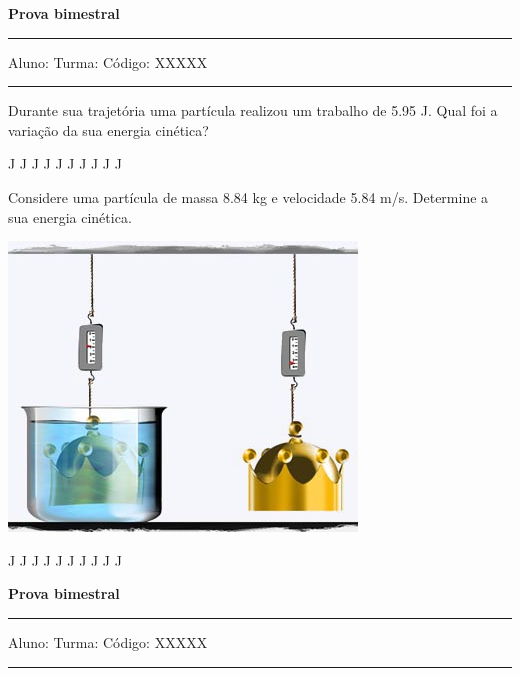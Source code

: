 \documentclass[addpoints]{exam}
\begin{document}
        
\begin{center}
	{\bf \Huge Prova bimestral}
	\vspace{1cm} \hrule \vspace{0.5cm}
	Aluno: \hfill Turma: \hfill Código: XXXXX
	\vspace{0.5cm} \hrule \vspace{0.5cm}
\end{center}

        \begin{questions}
\begin{multicols*}{2}
\question[33] Durante sua trajetória uma partícula realizou um trabalho de    5.95 J. Qual foi a variação da sua energia cinética?

\begin{oneparchoices}
 J J J J J J J J J J\end{oneparchoices}
\question[23] Considere uma partícula de massa    8.84 kg e velocidade    5.84 m/s. Determine a sua energia cinética.

\begin{center}
\begin{minipage}[c]{0.75\linewidth}
\includegraphics[width=\textwidth]{MWE001.jpg}
\end{minipage}

\end{center}
\begin{oneparchoices}
 J J J J J J J J J J\end{oneparchoices}
\end{multicols*}
\end{questions}
\newpage
\begin{center}
	{\bf \Huge Prova bimestral}
	\vspace{1cm} \hrule \vspace{0.5cm}
	Aluno: \hfill Turma: \hfill Código: XXXXX
	\vspace{0.5cm} \hrule \vspace{0.5cm}
\end{center}
\end{document}
